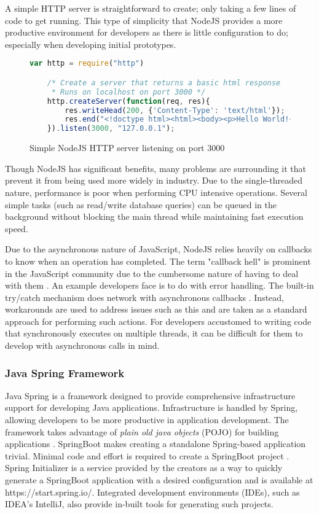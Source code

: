 A simple HTTP server is straightforward to create; only taking a few lines of code to get running. 
This type of simplicity that NodeJS provides a more productive environment for developers as there is little configuration to do;
especially when developing initial prototypes.

\begin{figure}[htb]
    \begin{lstlisting}[language=JavaScript, numbers=none]
    var http = require("http")

    /* Create a server that returns a basic html response
     * Runs on localhost on port 3000 */
    http.createServer(function(req, res){
        res.writeHead(200, {'Content-Type': 'text/html'});
        res.end("<!doctype html><html><body><p>Hello World!</p></body></html>");
    }).listen(3000, "127.0.0.1");
    \end{lstlisting}
    \caption{Simple NodeJS HTTP server listening on port 3000}
\end{figure}

Though NodeJS has significant benefits, many problems are surrounding it that prevent it from being used more widely in industry.
Due to the single-threaded nature, performance is poor when performing CPU intensive operations.
Several simple tasks (such as read/write database queries) can be queued in the background without blocking the main thread while
maintaining fast execution speed. 

Due to the asynchronous nature of JavaScript, NodeJS relies heavily on callbacks to know when an operation has completed.
The term "callback hell" is prominent in the JavaScript community due to the cumbersome nature of having to deal with them \cite{altexsoftnodejs}.
An example developers face is to do with error handling. The built-in try/catch mechanism does network with asynchronous callbacks \cite{gallaba2015don}.
Instead, workarounds are used to address issues such as this and are taken as a standard approach for performing such actions.
For developers accustomed to writing code that synchronously executes on multiple threads, it can be difficult for them to develop with asynchronous calls in mind.

\subsubsection{Java Spring Framework}
Java Spring is a framework designed to provide comprehensive infrastructure support for developing Java applications.
Infrastructure is handled by Spring, allowing developers to be more productive in application development.
The framework takes advantage of \textit{plain old java objects} (POJO) for building applications \cite{johnson2004spring}.
SpringBoot makes creating a standalone Spring-based application trivial. Minimal code and effort is required to create a SpringBoot 
project \cite{webb2013spring}.
Spring Initializer is a service provided by the creators as a way to quickly generate a SpringBoot application with a desired
configuration and is available at https://start.spring.io/.
Integrated development environments (IDEs), such as IDEA's IntelliJ, also provide in-built tools for generating such projects.

